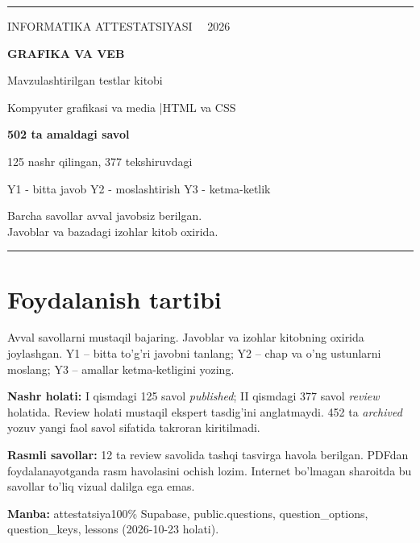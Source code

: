 \documentclass[10pt,a4paper,oneside]{article}
\begin{document}
\begin{titlepage}
\vspace*{30mm}
{\color{teal}\rule{\textwidth}{1.8pt}}\par
\vspace{18mm}
{\Large INFORMATIKA ATTESTATSIYASI \ \ 2026}\par
\vspace{7mm}
{\fontsize{31}{36}\selectfont\bfseries\color{ink}GRAFIKA VA VEB}\par
\vspace{5mm}
{\Large Mavzulashtirilgan testlar kitobi}\par
\vspace{19mm}
{\large Kompyuter grafikasi va media \quad|\quad HTML va CSS}\par
\vspace{13mm}
{\large\textbf{502 ta amaldagi savol}}\par
{\large 125 nashr qilingan, 377 tekshiruvdagi}\par
\vspace{15mm}
{\normalsize Y1 - bitta javob \quad Y2 - moslashtirish \quad Y3 - ketma-ketlik}\par
\vfill
{\color{muted}Barcha savollar avval javobsiz berilgan. \\
Javoblar va bazadagi izohlar kitob oxirida.}\par
\vspace{8mm}
{\color{teal}\rule{\textwidth}{1.8pt}}
\end{titlepage}
\section*{Foydalanish tartibi}
Avval savollarni mustaqil bajaring. Javoblar va izohlar kitobning oxirida joylashgan.
Y1 -- bitta to'g'ri javobni tanlang; Y2 -- chap va o'ng ustunlarni moslang; Y3 -- amallar ketma-ketligini yozing.
\par\textbf{Nashr holati:} I qismdagi 125 savol \textit{published}; II qismdagi 377 savol
\textit{review} holatida. Review holati mustaqil ekspert tasdig'ini anglatmaydi.
452 ta \textit{archived} yozuv yangi faol savol sifatida takroran kiritilmadi.
\par\textbf{Rasmli savollar:} 12 ta review savolida tashqi tasvirga havola berilgan.
PDFdan foydalanayotganda rasm havolasini ochish lozim. Internet bo'lmagan sharoitda
bu savollar to'liq vizual dalilga ega emas.
\par\textbf{Manba:} attestatsiya100\% Supabase, public.questions, question\_options, question\_keys, lessons (2026-10-23 holati).
\tableofcontents
\clearpage
\end{document}
